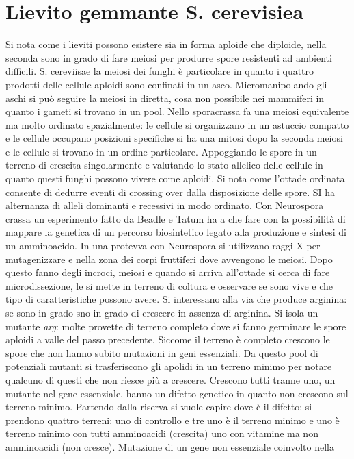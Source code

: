 \section{Lievito gemmante S. cerevisiea}
Si nota come i lieviti possono esistere sia in forma aploide che diploide, nella seconda sono in grado di fare meiosi per produrre spore resistenti ad ambienti difficili. S. 
cereviisae la meiosi dei funghi \`e particolare in quanto i quattro prodotti delle cellule aploidi sono confinati in un asco. Micromanipolando gli aschi si pu\`o seguire la meiosi
in diretta, cosa non possibile nei mammiferi in quanto i gameti si trovano in un pool. Nello sporacrassa fa una meiosi equivalente ma molto ordinato spazialmente: le cellule si 
organizzano in un astuccio compatto e le cellule occupano posizioni specifiche si ha una mitosi dopo la seconda meiosi e le cellule si trovano in un ordine particolare. Appoggiando 
le spore in un terreno di crescita singolarmente e valutando lo stato allelico delle cellule in quanto questi funghi possono vivere come aploidi. Si nota come l'ottade ordinata
consente di dedurre eventi di crossing over dalla disposizione delle spore. SI ha alternanza di alleli dominanti e recessivi in modo ordinato. Con Neurospora crassa un esperimento
fatto da Beadle e Tatum ha a che fare con la possibilit\`a di mappare la genetica di un percorso biosintetico legato alla produzione e sintesi di un amminoacido. In una protevva
con Neurospora si utilizzano raggi X per mutagenizzare e nella zona dei corpi fruttiferi dove avvengono le meiosi. Dopo questo fanno degli incroci, meiosi e quando si arriva 
all'ottade si cerca di fare microdissezione, le si mette in terreno di coltura e osservare se sono vive e che tipo di caratteristiche possono avere. Si interessano alla via che
produce arginina: se sono in grado sno in grado di crescere in assenza di arginina. Si isola un mutante \emph{arg}: molte provette di terreno completo dove si fanno germinare le
spore aploidi a valle del passo precedente. Siccome il terreno \`e completo crescono le spore che non hanno subito mutazioni in geni essenziali. Da questo pool di potenziali mutanti
si trasferiscono gli apolidi in un terreno minimo per notare qualcuno di questi che non riesce pi\`u a crescere. Crescono tutti tranne uno, un mutante nel gene essenziale, hanno un
difetto genetico in quanto non crescono sul terreno minimo. Partendo dalla riserva si vuole capire dove \`e il difetto: si prendono quattro terreni: uno di controllo e tre uno \`e
il terreno minimo  e uno \`e terreno minimo con tutti amminoacidi (crescita) uno con vitamine ma non amminoacidi (non cresce). Mutazione di un gene non essenziale coinvolto nella
